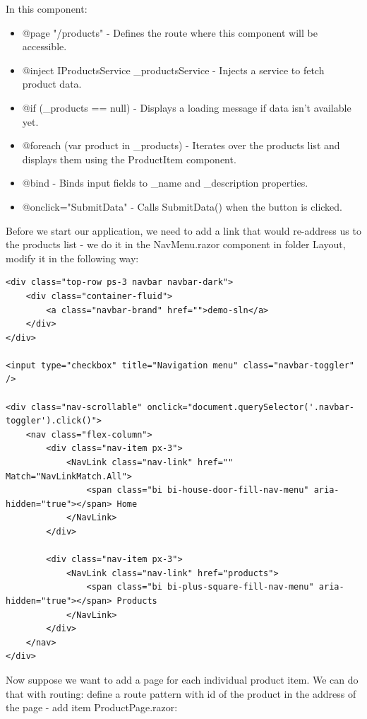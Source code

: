 In this component:
\begin{itemize}

\item @page "/products" - Defines the route where this component will be accessible.

\item @inject IProductsService \_productsService - Injects a service to fetch product data.

\item @if (\_products == null) - Displays a loading message if data isn't available yet.

\item @foreach (var product in \_products) - Iterates over the products list and displays them using the ProductItem component.

\item @bind - Binds input fields to \_name and \_description properties.

\item @onclick="SubmitData" - Calls SubmitData() when the button is clicked.
\end{itemize}


Before we start our application, we need to add a link that would re-address us to the products list - we do it in the NavMenu.razor component in folder Layout, modify it in the following way:



\begin{lstlisting}
<div class="top-row ps-3 navbar navbar-dark">
    <div class="container-fluid">
        <a class="navbar-brand" href="">demo-sln</a>
    </div>
</div>

<input type="checkbox" title="Navigation menu" class="navbar-toggler" />

<div class="nav-scrollable" onclick="document.querySelector('.navbar-toggler').click()">
    <nav class="flex-column">
        <div class="nav-item px-3">
            <NavLink class="nav-link" href="" Match="NavLinkMatch.All">
                <span class="bi bi-house-door-fill-nav-menu" aria-hidden="true"></span> Home
            </NavLink>
        </div>

        <div class="nav-item px-3">
            <NavLink class="nav-link" href="products">
                <span class="bi bi-plus-square-fill-nav-menu" aria-hidden="true"></span> Products
            </NavLink>
        </div>
    </nav>
</div>
\end{lstlisting}

Now suppose we want to add a page for each individual product item. We can do that with routing: define a route pattern with id of the product in the address of the page - add item ProductPage.razor:

